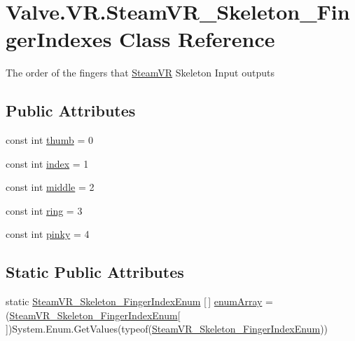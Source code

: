 \hypertarget{class_valve_1_1_v_r_1_1_steam_v_r___skeleton___finger_indexes}{}\section{Valve.\+V\+R.\+Steam\+V\+R\+\_\+\+Skeleton\+\_\+\+Finger\+Indexes Class Reference}
\label{class_valve_1_1_v_r_1_1_steam_v_r___skeleton___finger_indexes}


The order of the fingers that \mbox{\hyperlink{class_valve_1_1_v_r_1_1_steam_v_r}{Steam\+VR}} Skeleton Input outputs  


\subsection*{Public Attributes}
\begin{DoxyCompactItemize}
\item 
const int \mbox{\hyperlink{class_valve_1_1_v_r_1_1_steam_v_r___skeleton___finger_indexes_a18e68324ea9a2433032b0fe8b3900790}{thumb}} = 0
\item 
const int \mbox{\hyperlink{class_valve_1_1_v_r_1_1_steam_v_r___skeleton___finger_indexes_a2d11738e57d8295c478ca3b57f5680e4}{index}} = 1
\item 
const int \mbox{\hyperlink{class_valve_1_1_v_r_1_1_steam_v_r___skeleton___finger_indexes_a1ff7f73a1a586e424e63ed5a97b29e2f}{middle}} = 2
\item 
const int \mbox{\hyperlink{class_valve_1_1_v_r_1_1_steam_v_r___skeleton___finger_indexes_a8e96c9f11f5496cc18dd21ef55c4140f}{ring}} = 3
\item 
const int \mbox{\hyperlink{class_valve_1_1_v_r_1_1_steam_v_r___skeleton___finger_indexes_aa9eb0bcffa110037fc54b158ac467c6d}{pinky}} = 4
\end{DoxyCompactItemize}
\subsection*{Static Public Attributes}
\begin{DoxyCompactItemize}
\item 
static \mbox{\hyperlink{namespace_valve_1_1_v_r_ac40c4bdf0a3dcd6e69cad2d85f287c67}{Steam\+V\+R\+\_\+\+Skeleton\+\_\+\+Finger\+Index\+Enum}} \mbox{[}$\,$\mbox{]} \mbox{\hyperlink{class_valve_1_1_v_r_1_1_steam_v_r___skeleton___finger_indexes_a21b412e300052bb5467501733c268faa}{enum\+Array}} = (\mbox{\hyperlink{namespace_valve_1_1_v_r_ac40c4bdf0a3dcd6e69cad2d85f287c67}{Steam\+V\+R\+\_\+\+Skeleton\+\_\+\+Finger\+Index\+Enum}}\mbox{[}$\,$\mbox{]})System.\+Enum.\+Get\+Values(typeof(\mbox{\hyperlink{namespace_valve_1_1_v_r_ac40c4bdf0a3dcd6e69cad2d85f287c67}{Steam\+V\+R\+\_\+\+Skeleton\+\_\+\+Finger\+Index\+Enum}}))
\end{DoxyCompactItemize}


